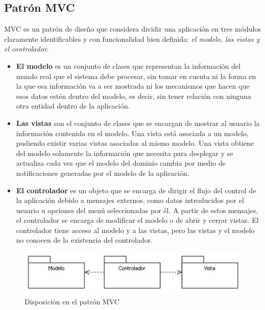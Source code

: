 		\subsection{Patrón MVC} %
			\label{sub:patron_mvc}
			
			MVC es un patrón de diseño que considera dividir una aplicación en tres módulos claramente identificables y con funcionalidad bien definida: {\it el modelo, las vistas y el controlador}.
			
			\begin{itemize}
				\item {\bf El modelo} es un conjunto de clases que representan la información del mundo real que el sistema debe procesar, sin tomar en cuenta ni la forma en la que esa información va a ser mostrada ni los mecanismos que hacen que esos datos estén dentro del modelo, es decir, sin tener relación con ninguna otra entidad dentro de la aplicación. 
				\item {\bf Las vistas} son el conjunto de clases que se encargan de mostrar al usuario la información contenida en el modelo. Una vista está asociada a un modelo, pudiendo existir varias vistas asociadas al mismo modelo. Una vista obtiene del modelo solamente la información que necesita para desplegar y se actualiza cada vez que el modelo del dominio cambia por medio de notificaciones generadas por el modelo de la aplicación.
				\item {\bf El controlador} es un objeto que se encarga de dirigir el flujo del control de la aplicación debido a mensajes externos, como datos introducidos por el usuario u opciones del menú seleccionadas por él. A partir de estos mensajes, el controlador se encarga de modificar el modelo o de abrir y cerrar vistas. El controlador tiene acceso al modelo y a las vistas, pero las vistas y el modelo no conocen de la existencia del controlador.
			\end{itemize}			
			
			\begin{figure}[H]
			  \centering
			    \includegraphics[width=12cm]{./eps/di_diagclases/mvc.eps}
			  \caption{Disposición en el patrón MVC}
			  \label{fig:patron_MVC}
			\end{figure}
			
